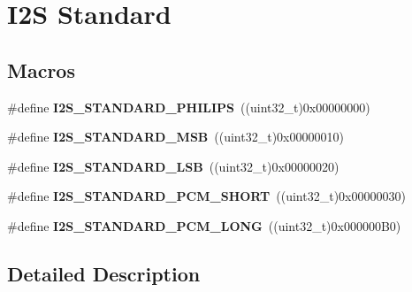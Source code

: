 \hypertarget{group___i2_s___standard}{}\section{I2S Standard}
\label{group___i2_s___standard}
\subsection*{Macros}
\begin{DoxyCompactItemize}
\item 
\#define {\bfseries I2\+S\+\_\+\+S\+T\+A\+N\+D\+A\+R\+D\+\_\+\+P\+H\+I\+L\+I\+PS}~((uint32\+\_\+t)0x00000000)\hypertarget{group___i2_s___standard_ga58725c7158549d3852a3acdfe7ac83cc}{}\label{group___i2_s___standard_ga58725c7158549d3852a3acdfe7ac83cc}

\item 
\#define {\bfseries I2\+S\+\_\+\+S\+T\+A\+N\+D\+A\+R\+D\+\_\+\+M\+SB}~((uint32\+\_\+t)0x00000010)\hypertarget{group___i2_s___standard_ga1d7e47055dc23008211ed60d0bd59bc3}{}\label{group___i2_s___standard_ga1d7e47055dc23008211ed60d0bd59bc3}

\item 
\#define {\bfseries I2\+S\+\_\+\+S\+T\+A\+N\+D\+A\+R\+D\+\_\+\+L\+SB}~((uint32\+\_\+t)0x00000020)\hypertarget{group___i2_s___standard_gaa71f6368c1113d02da713994fe735f37}{}\label{group___i2_s___standard_gaa71f6368c1113d02da713994fe735f37}

\item 
\#define {\bfseries I2\+S\+\_\+\+S\+T\+A\+N\+D\+A\+R\+D\+\_\+\+P\+C\+M\+\_\+\+S\+H\+O\+RT}~((uint32\+\_\+t)0x00000030)\hypertarget{group___i2_s___standard_ga2d9b2e3bec0a61f345aed2698720facc}{}\label{group___i2_s___standard_ga2d9b2e3bec0a61f345aed2698720facc}

\item 
\#define {\bfseries I2\+S\+\_\+\+S\+T\+A\+N\+D\+A\+R\+D\+\_\+\+P\+C\+M\+\_\+\+L\+O\+NG}~((uint32\+\_\+t)0x000000\+B0)\hypertarget{group___i2_s___standard_gae0755adecb5f500d2dfc87f91bd0c9a9}{}\label{group___i2_s___standard_gae0755adecb5f500d2dfc87f91bd0c9a9}

\end{DoxyCompactItemize}


\subsection{Detailed Description}
